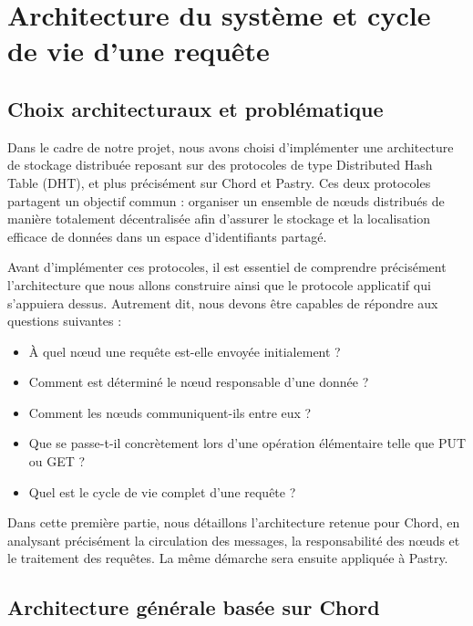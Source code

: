 \newpage
\section{Architecture du syst\`eme et cycle de vie d'une requ\^ete}

\subsection{Choix architecturaux et probl\'ematique}

Dans le cadre de notre projet, nous avons choisi d'impl\'ementer une architecture de stockage distribu\'ee reposant sur des protocoles de type Distributed Hash Table (DHT), et plus pr\'ecis\'ement sur Chord et Pastry. Ces deux protocoles partagent un objectif commun : organiser un ensemble de n\oe uds distribu\'es de mani\`ere totalement d\'ecentralis\'ee afin d'assurer le stockage et la localisation efficace de donn\'ees dans un espace d'identifiants partag\'e.

Avant d'impl\'ementer ces protocoles, il est essentiel de comprendre pr\'ecis\'ement l'architecture que nous allons construire ainsi que le protocole applicatif qui s'appuiera dessus. Autrement dit, nous devons \^etre capables de r\'epondre aux questions suivantes :

\begin{itemize}
    \item \`A quel n\oe ud une requ\^ete est-elle envoy\'ee initialement ?
    \item Comment est d\'etermin\'e le n\oe ud responsable d'une donn\'ee ?
    \item Comment les n\oe uds communiquent-ils entre eux ?
    \item Que se passe-t-il concr\`etement lors d'une op\'eration \'el\'ementaire telle que PUT ou GET ?
    \item Quel est le cycle de vie complet d'une requ\^ete ?
\end{itemize}

Dans cette premi\`ere partie, nous d\'etaillons l'architecture retenue pour Chord, en analysant pr\'ecis\'ement la circulation des messages, la responsabilit\'e des n\oe uds et le traitement des requ\^etes. La m\^eme d\'emarche sera ensuite appliqu\'ee \`a Pastry.

\subsection{Architecture g\'en\'erale bas\'ee sur Chord}


